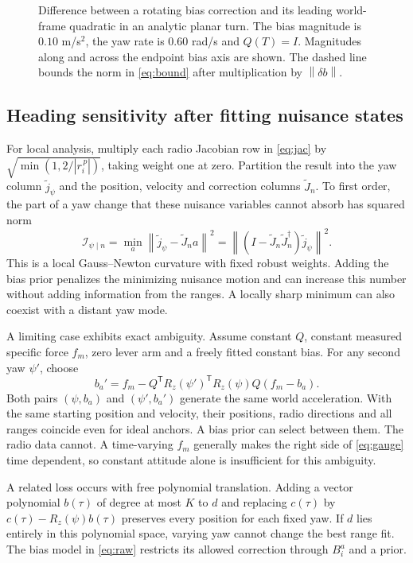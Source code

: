 \documentclass{IEEEtaes}
\newcommand{\rz}{R_z}
\newcommand{\norm}[1]{\left\lVert#1\right\rVert}
\newcommand{\trans}{^{\mathsf T}}
\begin{document}
\begin{figure}[t]
\centering

\caption{Difference between a rotating bias correction and its leading world-frame quadratic in an analytic planar turn. The bias magnitude is \(0.10\) m/s\(^2\), the yaw rate is \(0.60\) rad/s and \(Q(T)=I\). Magnitudes along and across the endpoint bias axis are shown. The dashed line bounds the norm in \eqref{eq:bound} after multiplication by \(\norm{\delta b}\).}
\label{fig:turn}
\end{figure}

\subsection{Heading sensitivity after fitting nuisance states}
For local analysis, multiply each radio Jacobian row in \eqref{eq:jac} by \(\sqrt{\min(1,2/|r_i^{\,p}|)}\), taking weight one at zero. Partition the result into the yaw column \(\tilde j_\psi\) and the position, velocity and correction columns \(\tilde J_n\). To first order, the part of a yaw change that these nuisance variables cannot absorb has squared norm
\begin{equation}
 \mathcal I_{\psi\mid n}
 =\min_a\norm{\tilde j_\psi-\tilde J_n a}^2
 =\norm{(I-\tilde J_n\tilde J_n^\dagger)\tilde j_\psi}^2 .
 \label{eq:curvature}
\end{equation}
This is a local Gauss--Newton curvature with fixed robust weights. Adding the bias prior penalizes the minimizing nuisance motion and can increase this number without adding information from the ranges. A locally sharp minimum can also coexist with a distant yaw mode.

A limiting case exhibits exact ambiguity. Assume constant \(Q\), constant measured specific force \(f_m\), zero lever arm and a freely fitted constant bias. For any second yaw \(\psi'\), choose
\begin{equation}
 b_a'=f_m-Q\trans\rz(\psi')\trans\rz(\psi)Q(f_m-b_a).
 \label{eq:gauge}
\end{equation}
Both pairs \((\psi,b_a)\) and \((\psi',b_a')\) generate the same world acceleration. With the same starting position and velocity, their positions, radio directions and all ranges coincide even for ideal anchors. A bias prior can select between them. The radio data cannot. A time-varying \(f_m\) generally makes the right side of \eqref{eq:gauge} time dependent, so constant attitude alone is insufficient for this ambiguity.

A related loss occurs with free polynomial translation. Adding a vector polynomial \(b(\tau)\) of degree at most \(K\) to \(d\) and replacing \(c(\tau)\) by \(c(\tau)-\rz(\psi)b(\tau)\) preserves every position for each fixed yaw. If \(d\) lies entirely in this polynomial space, varying yaw cannot change the best range fit. The bias model in \eqref{eq:raw} restricts its allowed correction through \(B_i^a\) and a prior.
\end{document}
